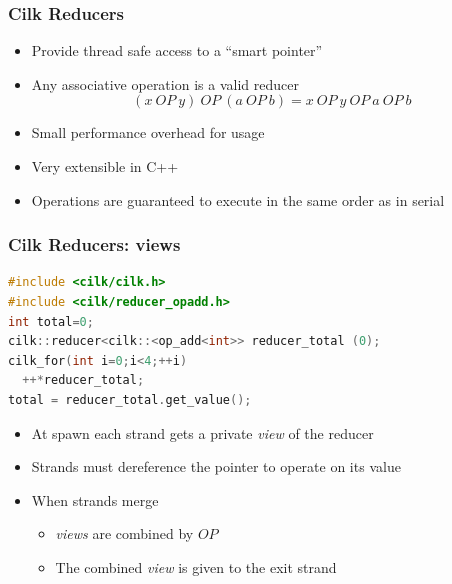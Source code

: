 \documentclass[fleqn,xcolor=table,10pt,final]{beamer}
\begin{document}
\begin{frame}
  \frametitle{Cilk Reducers}
  \begin{itemize}
    \itemsep 0.5cm
    \item Provide thread safe access to a ``smart pointer''
    \item Any associative operation is a valid reducer
      \begin{equation*}
        \left(x\ OP\ y\right)\ OP\ \left(a\ OP\ b\right) = x\ OP\ y\ OP\ a\ OP\ b
      \end{equation*}
    \item Small performance overhead for usage
    \item Very extensible in C++
    \item Operations are guaranteed to execute in the same order as in serial
  \end{itemize}
\end{frame}

\begin{frame}[fragile]
  \frametitle{Cilk Reducers: views}
  \begin{lstlisting}[language=C++,basicstyle=\scriptsize]
#include <cilk/cilk.h>
#include <cilk/reducer_opadd.h>
int total=0;
cilk::reducer<cilk::<op_add<int>> reducer_total (0);
cilk_for(int i=0;i<4;++i)
  ++*reducer_total;
total = reducer_total.get_value();
  \end{lstlisting}
  \begin{itemize}
    \itemsep 0.4cm
    \item At spawn each strand gets a private \emph{view} of the reducer
    \item Strands must dereference the pointer to operate on its value
    \item When strands merge
      \begin{itemize}
        \item \emph{views} are combined by $OP$
        \item The combined \emph{view} is given to the exit strand
      \end{itemize}
  \end{itemize}
\end{frame}
\end{document}
